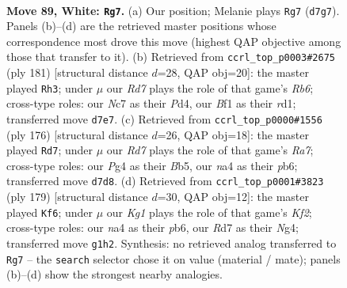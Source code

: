 \documentclass[11pt]{article}
\begin{document}
\clearpage

\begin{figure}[p]\centering
\begin{subfigure}{0.46\textwidth}\centering
\resizebox{\linewidth}{!}{%
\newchessgame
\chessboard[
  setfen={8/2NR4/2b5/5P2/np4Pk/8/8/5BK1 w - - 0 89},
  showmover=false,
  pgfstyle=straightmove, color=movearrow, markmove={d7-g7}
]}
\caption{}
\end{subfigure}\hfill
\begin{subfigure}{0.46\textwidth}\centering
\resizebox{\linewidth}{!}{%
\newchessgame
\chessboard[
  setfen={8/8/1p6/p7/2Bp1K2/1r6/5k2/3R4 b - - 19 91},
  showmover=false,
  pgfstyle=straightmove, color=movearrow, markmove={b3-h3}
]}
\caption{}
\end{subfigure}
\\[4pt]
\begin{subfigure}{0.46\textwidth}\centering
\resizebox{\linewidth}{!}{%
\newchessgame
\chessboard[
  setfen={1b3k2/R7/1p2p3/1B5K/4b3/P7/8/8 w - - 10 89},
  showmover=false,
  pgfstyle=straightmove, color=movearrow, markmove={a7-d7}
]}
\caption{}
\end{subfigure}\hfill
\begin{subfigure}{0.46\textwidth}\centering
\resizebox{\linewidth}{!}{%
\newchessgame
\chessboard[
  setfen={8/5k2/bP6/8/3K2n1/5BB1/7p/8 b - - 14 90},
  showmover=false,
  pgfstyle=straightmove, color=movearrow, markmove={f7-f6}
]}
\caption{}
\end{subfigure}
\caption{\textbf{Move 89, White: \texttt{Rg7}.} (a) Our position; Melanie plays \texttt{Rg7} (\texttt{d7g7}). Panels (b)--(d) are the retrieved master positions whose correspondence most drove this move (highest QAP objective among those that transfer to it). (b) Retrieved from \texttt{ccrl\_top\_p0003\#2675} (ply 181) [structural distance $d$=28, QAP obj=20]: the master played \texttt{Rh3}; under $\mu$ our \emph{Rd7} plays the role of that game's \emph{Rb6}; cross-type roles: our \emph{N}c7 as their \emph{P}d4, our \emph{B}f1 as their \emph{r}d1; transferred move \texttt{d7e7}. (c) Retrieved from \texttt{ccrl\_top\_p0000\#1556} (ply 176) [structural distance $d$=26, QAP obj=18]: the master played \texttt{Rd7}; under $\mu$ our \emph{Rd7} plays the role of that game's \emph{Ra7}; cross-type roles: our \emph{P}g4 as their \emph{B}b5, our \emph{n}a4 as their \emph{p}b6; transferred move \texttt{d7d8}. (d) Retrieved from \texttt{ccrl\_top\_p0001\#3823} (ply 179) [structural distance $d$=30, QAP obj=12]: the master played \texttt{Kf6}; under $\mu$ our \emph{Kg1} plays the role of that game's \emph{Kf2}; cross-type roles: our \emph{n}a4 as their \emph{p}b6, our \emph{R}d7 as their \emph{N}g4; transferred move \texttt{g1h2}. Synthesis: no retrieved analog transferred to \texttt{Rg7} -- the \texttt{search} selector chose it on value (material / mate); panels (b)--(d) show the strongest nearby analogies.}
\label{fig:thought-m176}
\end{figure}
\end{document}
